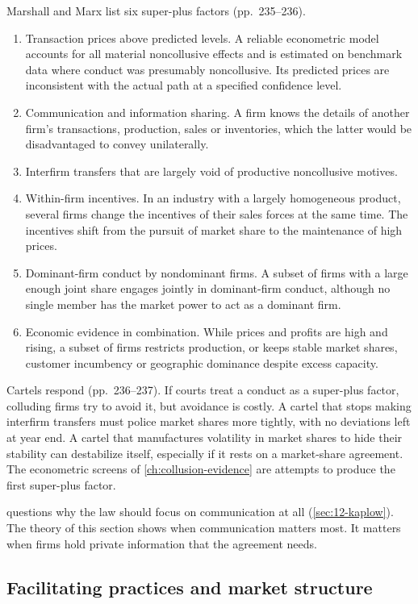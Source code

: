 Marshall and Marx list six super-plus factors (pp.~235--236).
\begin{enumerate}[label=(\arabic*), leftmargin=*, itemsep=2pt]
\item Transaction prices above predicted levels. A reliable econometric model accounts for all material
noncollusive effects and is estimated on benchmark data where conduct was presumably noncollusive. Its predicted
prices are inconsistent with the actual path at a specified confidence level.
\item Communication and information sharing. A firm knows the details of another firm's transactions, production,
sales or inventories, which the latter would be disadvantaged to convey unilaterally.
\item Interfirm transfers that are largely void of productive noncollusive motives.
\item Within-firm incentives. In an industry with a largely homogeneous product, several firms change the incentives
of their sales forces at the same time. The incentives shift from the pursuit of market share to the maintenance of
high prices.
\item Dominant-firm conduct by nondominant firms. A subset of firms with a large enough joint share engages jointly
in dominant-firm conduct, although no single member has the market power to act as a dominant firm.
\item Economic evidence in combination. While prices and profits are high and rising, a subset of firms restricts
production, or keeps stable market shares, customer incumbency or geographic dominance despite excess capacity.
\end{enumerate}
Cartels respond (pp.~236--237). If courts treat a conduct as a super-plus factor, colluding firms try to avoid it,
but avoidance is costly. A cartel that stops making interfirm transfers must police market shares more tightly, with
no deviations left at year end. A cartel that manufactures volatility in market shares to hide their stability can
destabilize itself, especially if it rests on a market-share agreement. The econometric screens of
\cref{ch:collusion-evidence} are attempts to produce the first super-plus factor.

\citet{Kaplow2013} questions why the law should focus on communication at all (\cref{sec:12-kaplow}). The theory of
this section shows when communication matters most. It matters when firms hold private information that the
agreement needs.

\subsection{Facilitating practices and market structure}\label{sec:12-facilitating}

